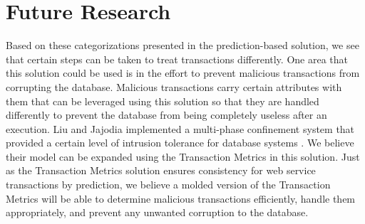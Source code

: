 \documentclass[conference]{IEEEtran}
\begin{document}
\section{Future Research}
\label{sec:future_research}
Based on these categorizations presented in the prediction-based solution, we see that certain steps can be taken to treat transactions differently. One area that this solution could be used is in the effort to prevent malicious transactions from corrupting the database. Malicious transactions carry certain attributes with them that can be leveraged using this solution so that they are handled differently to prevent the database from being completely useless after an execution. Liu and Jajodia implemented a multi-phase confinement system that provided a certain level of intrusion tolerance for database systems \cite{Liu_Intrusion}. We believe their model can be expanded using the Transaction Metrics in this solution. Just as the Transaction Metrics solution ensures consistency for web service transactions by prediction, we believe a molded version of the Transaction Metrics will be able to determine malicious transactions efficiently, handle them appropriately, and prevent any unwanted corruption to the database.


%


\end{document}
